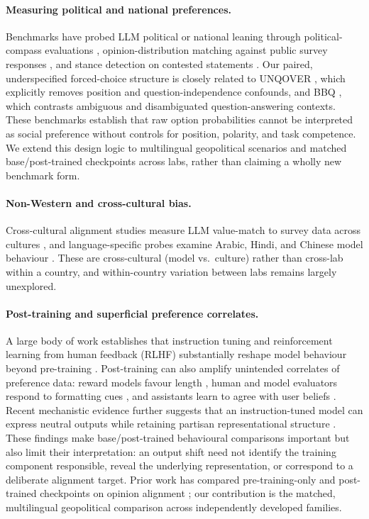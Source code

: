 \documentclass[letterpaper]{article}
\begin{document}
\paragraph{Measuring political and national preferences.} Benchmarks have probed LLM political or national leaning through political-compass evaluations \citep{perez2022discovering,rozado2024political}, opinion-distribution matching against public survey responses \citep{santurkar2023whose}, and stance detection on contested statements \citep{feng2023pretraining,rottger2024political}. Our paired, underspecified forced-choice structure is closely related to UNQOVER \citep{li2020unqover}, which explicitly removes position and question-independence confounds, and BBQ \citep{parrish2022bbq}, which contrasts ambiguous and disambiguated question-answering contexts. These benchmarks establish that raw option probabilities cannot be interpreted as social preference without controls for position, polarity, and task competence. We extend this design logic to multilingual geopolitical scenarios and matched base/post-trained checkpoints across labs, rather than claiming a wholly new benchmark form.

\paragraph{Non-Western and cross-cultural bias.} Cross-cultural alignment studies measure LLM value-match to survey data across cultures \citep{tao2024cultural,durmus2024globalopinionqa}, and language-specific probes examine Arabic, Hindi, and Chinese model behaviour \citep{naous2024beer,cao2023assessing}. These are cross-cultural (model vs.\ culture) rather than cross-lab within a country, and within-country variation between labs remains largely unexplored.

\paragraph{Post-training and superficial preference correlates.} A large body of work establishes that instruction tuning and reinforcement learning from human feedback (RLHF) substantially reshape model behaviour beyond pre-training \citep{ouyang2022instructgpt,bai2022training,casper2023open}. Post-training can also amplify unintended correlates of preference data: reward models favour length \citep{singhal2024length}, human and model evaluators respond to formatting cues \citep{zhang2025format}, and assistants learn to agree with user beliefs \citep{sharma2024sycophancy}. Recent mechanistic evidence further suggests that an instruction-tuned model can express neutral outputs while retaining partisan representational structure \citep{tam2026neutral}. These findings make base/post-trained behavioural comparisons important but also limit their interpretation: an output shift need not identify the training component responsible, reveal the underlying representation, or correspond to a deliberate alignment target. Prior work has compared pre-training-only and post-trained checkpoints on opinion alignment \citep{durmus2024globalopinionqa}; our contribution is the matched, multilingual geopolitical comparison across independently developed families.
\end{document}
